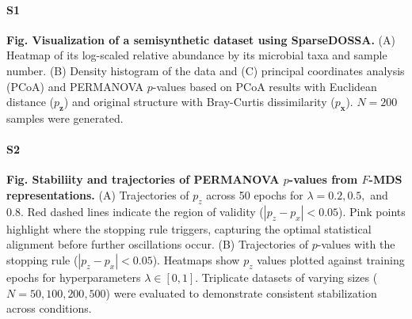 \documentclass[10pt,letterpaper]{article}
\newcommand{\1}{{\rm 1}\kern-0.24em{\rm I}}
\begin{document}




\paragraph*{S1}\hspace{-2ex}
\label{fig:sim_data_vis}
{\bf Fig. Visualization of a semisynthetic dataset using SparseDOSSA.} (A) Heatmap of its log-scaled relative abundance by its microbial taxa and sample number. (B) Density histogram of the data and (C) principal coordinates analysis (PCoA) and PERMANOVA $p$-values based on PCoA results with Euclidean distance ($p_\mathbf{z}$) and original structure with Bray-Curtis dissimilarity ($p_\mathbf{x}$). $N=200$ samples were generated.

\paragraph*{S2}\hspace{-2ex}
\label{fig:sim_fmds_track}
{\bf Fig. Stabiliity and trajectories of PERMANOVA $p$-values from $F$-MDS representations.} (A) Trajectories of $p_z$ across 50 epochs for $\lambda = 0.2, 0.5,$ and $0.8$. Red dashed lines indicate the region of validity ($|p_z - p_x| < 0.05$). Pink points highlight where the stopping rule triggers, capturing the optimal statistical alignment before further oscillations occur. (B) Trajectories of $p$-values with the stopping rule ($|p_z - p_x| < 0.05$). Heatmaps show $p_z$ values plotted against training epochs for hyperparameters $\lambda \in [0,1]$. Triplicate datasets of varying sizes ($N = 50, 100, 200, 500$) were evaluated to demonstrate consistent stabilization across conditions.
\end{document}
